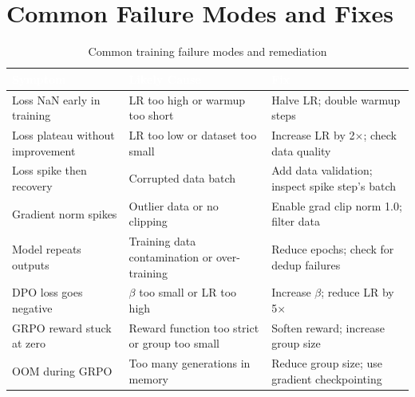 \section{Common Failure Modes and Fixes}

\begin{table}[H]
\centering\small\sffamily
{}
\begin{tabular}{L{3.5cm}L{3cm}L{4.5cm}}
\toprule
{}\textcolor{white}{\textbf{Symptom}} & \textcolor{white}{\textbf{Likely Cause}} & \textcolor{white}{\textbf{Fix}} \\
\midrule
Loss NaN early in training & LR too high or warmup too short & Halve LR; double warmup steps \\
Loss plateau without improvement & LR too low or dataset too small & Increase LR by 2$\times$; check data quality \\
Loss spike then recovery & Corrupted data batch & Add data validation; inspect spike step's batch \\
Gradient norm spikes & Outlier data or no clipping & Enable grad clip norm 1.0; filter data \\
Model repeats outputs & Training data contamination or over-training & Reduce epochs; check for dedup failures \\
DPO loss goes negative & $\beta$ too small or LR too high & Increase $\beta$; reduce LR by 5$\times$ \\
GRPO reward stuck at zero & Reward function too strict or group too small & Soften reward; increase group size \\
OOM during GRPO & Too many generations in memory & Reduce group size; use gradient checkpointing \\
\bottomrule
\end{tabular}
\caption{Common training failure modes and remediation}
\end{table}
